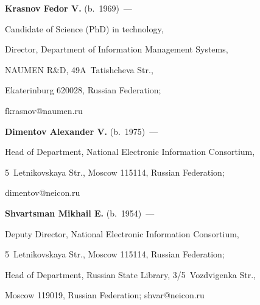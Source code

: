 




\Contr





\noindent


\textbf{Krasnov Fedor V.} (b.\ 1969)~--- 


Candidate of Science (PhD) in technology,


Director,  Department of Information Management Systems,


NAUMEN R\&D, 49A~Tatishcheva Str.,


Ekaterinburg 620028, Russian Federation; 


\mbox{fkrasnov@naumen.ru}





\vspace*{6pt}





\noindent


\textbf{Dimentov Alexander V.} (b.\ 1975)~--- 


Head of Department, National Electronic Information Consortium, 


5~Letnikovskaya Str., Moscow 115114, Russian Federation; 


\mbox{dimentov@neicon.ru}








\vspace*{6pt}





\noindent


\textbf{Shvartsman Mikhail E.} (b.\ 1954)~--- 


Deputy Director, National Electronic Information Consortium, 


5~Letnikovskaya Str., Moscow 115114, Russian Federation; 


Head of Department, Russian State Library, 3/5~Vozdvigenka Str., 


Moscow 119019, Russian Federation; \mbox{shvar@neicon.ru}


\label{end\stat}





\renewcommand{\bibname}{\protect\rm Литература} 


